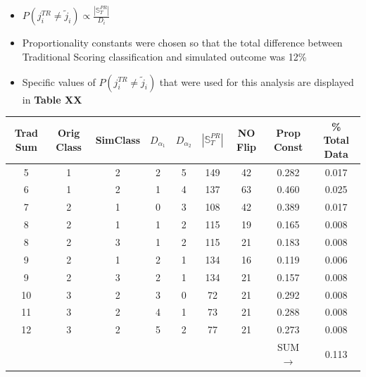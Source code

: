 \documentclass[12pt,]{article}
\providecommand{\tightlist}{%
  \setlength{\itemsep}{0pt}\setlength{\parskip}{0pt}}
\begin{document}
\begin{itemize}
  \begin{itemize}
  \tightlist
  \item
    \(P\left(j_{i}^{TR} \neq \tilde{j}_{i} \right) \propto \frac{|\mathbb{S}^{PR}_{T}|}{D_{i}}\)
  \item
    Proportionality constants were chosen so that the total difference
    between Traditional Scoring classification and simulated outcome was
    12\%
  \item
    Specific values of \(P\left(j_{i}^{TR} \neq \tilde{j}_{i} \right)\)
    that were used for this analysis are displayed in \textbf{Table XX}
  \end{itemize}
\end{itemize}

\begin{center}
\begin{tabular}{|c|c|c|c|c|c|c|c|c|}
\hline
Trad Sum & Orig Class & SimClass & $D_{\alpha_{1}}$ & $D_{\alpha_{2}}$ & $|\mathbb{S}_{T}^{PR}|$ & NO Flip & Prop Const & \% Total Data \\
\hline
\hline
5 & 1 & 2 & 2 & 5 & 149 & 42 & 0.282 & 0.017 \\
\hline
6 & 1 & 2 & 1 & 4 & 137 & 63 & 0.460 & 0.025 \\
\hline
7 & 2 & 1 & 0 & 3 & 108 & 42 & 0.389 & 0.017 \\
\hline
8 & 2 & 1 & 1 & 2 & 115 & 19 & 0.165 & 0.008 \\
\hline
8 & 2 & 3 & 1 & 2 & 115 & 21 & 0.183 & 0.008 \\
\hline
9 & 2 & 1 & 2 & 1 & 134 & 16 & 0.119 & 0.006 \\
\hline
9 & 2 & 3 & 2 & 1 & 134 & 21 & 0.157 & 0.008 \\
\hline
10 & 3 & 2 & 3 & 0 & 72 & 21 & 0.292 & 0.008 \\
\hline
11 & 3 & 2 & 4 & 1 & 73 & 21 & 0.288 & 0.008 \\
\hline
12 & 3 & 2 & 5 & 2 & 77 & 21 & 0.273 & 0.008 \\
\hline
 &  &  &  &  &  &  & SUM $\rightarrow$ & 0.113 \\
\hline
\end{tabular}
\end{center}
\end{document}
